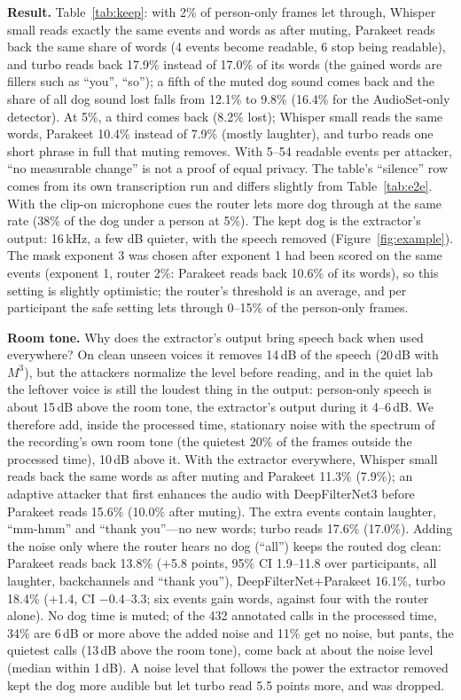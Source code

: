 \documentclass[10pt,twocolumn,a4paper]{article}
\begin{document}
\textbf{Result.} Table~\ref{tab:keep}: with 2\% of person-only frames let through, Whisper small reads
exactly the same events and words as after muting, Parakeet reads back the same share of words (4 events
become readable, 6 stop being readable), and turbo reads back 17.9\% instead of 17.0\% of its words (the
gained words are fillers such as ``you'', ``so''); a fifth of the muted dog sound comes back and the share
of all dog sound lost falls from 12.1\% to 9.8\% (16.4\% for the AudioSet-only detector). At 5\%, a third
comes back (8.2\% lost); Whisper small reads the same words, Parakeet 10.4\% instead of 7.9\% (mostly
laughter), and turbo reads one short phrase in full that muting removes. With 5--54 readable events per
attacker, ``no measurable change'' is not a proof of equal privacy. The table's ``silence'' row comes from
its own transcription run and differs slightly from Table~\ref{tab:e2e}. With the clip-on microphone cues
the router lets more dog through at the same rate (38\% of the dog under a person at 5\%). The kept dog is
the extractor's output: 16\,kHz, a few dB quieter, with the speech removed (Figure~\ref{fig:example}). The
mask exponent 3 was chosen after exponent 1 had been scored on the same events (exponent 1, router 2\%:
Parakeet reads back 10.6\% of its words), so this setting is slightly optimistic; the router's threshold
is an average, and per participant the safe setting lets through 0--15\% of the person-only frames.

\textbf{Room tone.} Why does the extractor's output bring speech back when used everywhere? On clean
unseen voices it removes 14\,dB of the speech (20\,dB with $M^3$), but the attackers normalize the level
before reading, and in the quiet lab the leftover voice is still the loudest thing in the output: person-only
speech is about 15\,dB above the room tone, the extractor's output during it 4--6\,dB. We therefore add,
inside the processed time, stationary noise with the spectrum of the recording's own room tone (the
quietest 20\% of the frames outside the processed time), 10\,dB above it. With the extractor everywhere,
Whisper small reads back the same words as after muting and Parakeet 11.3\% (7.9\%); an adaptive attacker
that first enhances the audio with DeepFilterNet3 \cite{schroeter2023deepfilternet3} before Parakeet reads
15.6\% (10.0\% after muting). The extra events contain laughter, ``mm-hmm'' and ``thank you''---no new
words; turbo reads 17.6\% (17.0\%). Adding the noise only where the router hears no dog (``all'') keeps
the routed dog clean: Parakeet reads back 13.8\% ($+$5.8 points, 95\% CI 1.9--11.8 over participants, all
laughter, backchannels and ``thank you''), DeepFilterNet+Parakeet 16.1\%, turbo 18.4\% ($+$1.4, CI
$-$0.4--3.3; six events gain words, against four with the router alone). No dog time is muted; of the
432 annotated calls in the processed time, 34\% are 6\,dB or more above the added noise and 11\% get no
noise, but pants, the quietest calls (13\,dB above the room tone), come back at about the noise level
(median within 1\,dB). A noise level that follows the power the extractor removed kept the dog more audible
but let turbo read 5.5 points more, and was dropped.
\end{document}
